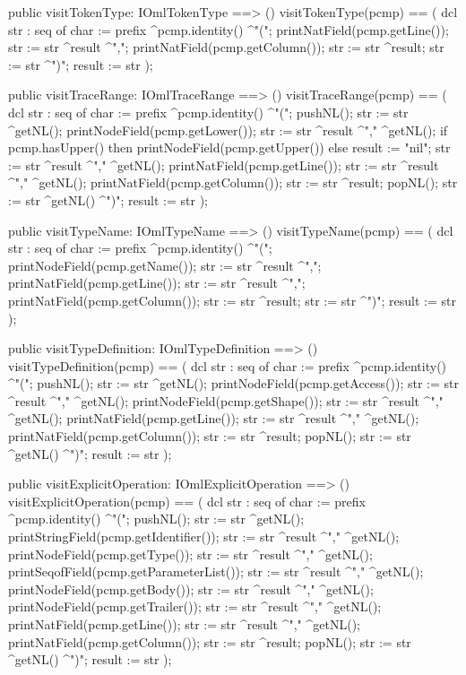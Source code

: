 \begin{vdm_al}
  public visitTokenType: IOmlTokenType ==> ()
  visitTokenType(pcmp) ==
    ( dcl str : seq of char := prefix ^pcmp.identity() ^"(";
      printNatField(pcmp.getLine());
      str := str ^result ^",";
      printNatField(pcmp.getColumn());
      str := str ^result;
      str := str ^")";
      result := str );

  public visitTraceRange: IOmlTraceRange ==> ()
  visitTraceRange(pcmp) ==
    ( dcl str : seq of char := prefix ^pcmp.identity() ^"(";
      pushNL();
      str := str ^getNL();
      printNodeField(pcmp.getLower());
      str := str ^result ^"," ^getNL();
      if pcmp.hasUpper()
      then printNodeField(pcmp.getUpper())
      else result := "nil";
      str := str ^result ^"," ^getNL();
      printNatField(pcmp.getLine());
      str := str ^result ^"," ^getNL();
      printNatField(pcmp.getColumn());
      str := str ^result;
      popNL();
      str := str ^getNL() ^")";
      result := str );

  public visitTypeName: IOmlTypeName ==> ()
  visitTypeName(pcmp) ==
    ( dcl str : seq of char := prefix ^pcmp.identity() ^"(";
      printNodeField(pcmp.getName());
      str := str ^result ^",";
      printNatField(pcmp.getLine());
      str := str ^result ^",";
      printNatField(pcmp.getColumn());
      str := str ^result;
      str := str ^")";
      result := str );

  public visitTypeDefinition: IOmlTypeDefinition ==> ()
  visitTypeDefinition(pcmp) ==
    ( dcl str : seq of char := prefix ^pcmp.identity() ^"(";
      pushNL();
      str := str ^getNL();
      printNodeField(pcmp.getAccess());
      str := str ^result ^"," ^getNL();
      printNodeField(pcmp.getShape());
      str := str ^result ^"," ^getNL();
      printNatField(pcmp.getLine());
      str := str ^result ^"," ^getNL();
      printNatField(pcmp.getColumn());
      str := str ^result;
      popNL();
      str := str ^getNL() ^")";
      result := str );

  public visitExplicitOperation: IOmlExplicitOperation ==> ()
  visitExplicitOperation(pcmp) ==
    ( dcl str : seq of char := prefix ^pcmp.identity() ^"(";
      pushNL();
      str := str ^getNL();
      printStringField(pcmp.getIdentifier());
      str := str ^result ^"," ^getNL();
      printNodeField(pcmp.getType());
      str := str ^result ^"," ^getNL();
      printSeqofField(pcmp.getParameterList());
      str := str ^result ^"," ^getNL();
      printNodeField(pcmp.getBody());
      str := str ^result ^"," ^getNL();
      printNodeField(pcmp.getTrailer());
      str := str ^result ^"," ^getNL();
      printNatField(pcmp.getLine());
      str := str ^result ^"," ^getNL();
      printNatField(pcmp.getColumn());
      str := str ^result;
      popNL();
      str := str ^getNL() ^")";
      result := str );


\end{vdm_al}
